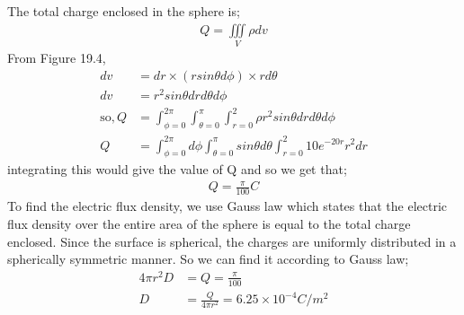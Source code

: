 \begin{exmp}
The total charge enclosed in the sphere is;
\begin{align*}
Q=\iiint\limits_V\rho dv
\end{align*}
From Figure 19.4, 
\begin{align*}
dv &= dr\times(rsin\theta d\phi)\times rd\theta \\
dv&=r^{2}sin\theta drd\theta d\phi\\
\text{so}, Q&=\int^{2\pi}_{\phi=0}\int^{\pi}_{\theta=0}\int^{2}_{r=0} \rho r^{2}sin\theta drd\theta d\phi\\
Q&= \int^{2\pi}_{\phi=0}d\phi\int^{\pi}_{\theta=0}sin\theta d\theta\int^{2}_{r=0}10e^{-20r}r^{2}dr
\end{align*}
integrating this would give the value of Q and so we get that;
\begin{align*}
Q=\frac{\pi}{100} C
\end{align*}
To find the electric flux density, we use Gauss law which states that the electric flux density over the entire area of the sphere is equal to the total charge enclosed. Since the surface is spherical, the charges are uniformly distributed in a spherically symmetric manner. So we can find it according to Gauss law;
\begin{align*}
4\pi r^{2}D&=Q=\frac{\pi}{100}\\
D&=\frac{Q}{4\pi r^{2}}= 6.25\times10^{-4} C/m^{2}
\end{align*}
\end{exmp}

